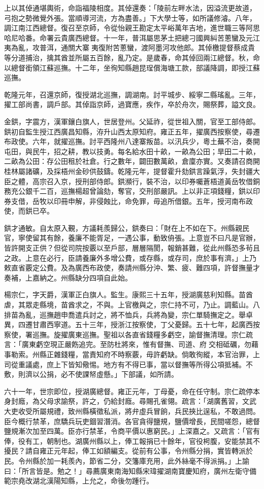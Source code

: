 \begin{pinyinscope}
上以其倬通堪輿術，命詣福陵相度。其倬還奏：「陵前左畔水法，因溢流更故道，弓抱之勢微覺外張。當順導河流，方為盡善。」下大學士等，如所議修濬。八年，調江南江西總督。復召至京師，令從怡親王勘定太平峪萬年吉地，進世職三等阿思哈尼哈番。命署云貴廣西總督。十一年，普洱屬思茅土把總刁國興糾苦蔥蠻及元江夷為亂，攻普洱，通關大寨夷復附苦蔥蠻，渡阿墨河攻他郎。其倬檄提督蔡成貴等分道捕治，擒其酋並所屬五百餘，亂乃定。是歲春，命其倬回兩江總督。秋，命以總督銜領江蘇巡撫。十二年，坐徇知縣趙昆珵償海塘工款，部議降調，即授江蘇巡撫。

乾隆元年，召還京師，復授湖北巡撫，調湖南。討平城步、綏寧二縣瑤亂。三年，擢工部尚書，調戶部。其倬詣京師，過寶應，疾作，卒於舟次，賜祭葬，謚文良。

金鉷，字震方，漢軍鑲白旗人，世居登州。父延祚，從世祖入關，官至工部侍郎。鉷初自監生授江西廣昌知縣，洊升山西太原知府。雍正五年，擢廣西按察使，尋遷布政使。六年，就擢巡撫。討平西隆州八達寨叛苗。以汛兵少，粵土蕪不治，奏開屯田，與民牛，招之耕，教以技勇。每名給水田十畝，一畝為公田；旱田二十畝，二畝為公田：存公田租於社倉。行之數年，闢田數萬畝，倉廩亦實。又奏請召商開桂林屬諸礦，及採梧州金砂供鼓鑄。乾隆元年，提督霍升劾鉷言躁氣浮，失封疆大臣之體，高宗召入京，授刑部侍郎。鉷瀕行，裝不治，以印券囑蒼梧道黃岳牧借銅務充公銀千二百，巡撫楊超曾論劾，奪官，交刑部嚴訊。上以非正項錢糧，鉷以印券支借，岳牧以印冊申解，非侵蝕比，命免罪，毋追所借銀。五年，授河南布政使，而鉷已卒。

鉷才通敏。自太原入覲，方議耗羨歸公，鉷奏曰：「財在上不如在下。州縣親民官，寧使留其有餘，養廉不能胥足，一遇公事，動致侜張。上意豈不曰凡是官辦，皆許開支正供？但從司院按覈以至戶部，層層隔閡，報銷甚難，從此州縣恐多茍且之政。上意在必行，臣請養廉外多增公費，或存縣，或存司，庶於事有濟。」上乃敕直省覈定公費。及為廣西布政使，奏請州縣分沖、繁、疲、難四項，許督撫量才奏補，上嘉納之。州縣缺分四項自此始。

楊宗仁，字天爵，漢軍正白旗人。監生。康熙三十五年，授湖廣慈利知縣。苗酋虐，其眾走縣境，苗酋求之，不與。上官檄與之，宗仁持不可，乃止。調藍山。八排苗為亂，巡撫趙申喬遣兵討之，將不恤兵，兵將為變，宗仁單騎撫定之。舉卓異，四遷甘肅西寧道。五十三年，授浙江按察使，丁父憂歸。五十七年，起廣西按察使，署巡撫。旋擢廣東巡撫。聖祖以各直省錢糧多虧空，諭督撫清理。宗仁疏言：「廣東虧空現正嚴飭追完。至防杜將來，惟有督撫、司道、府交相砥礪，勿藉事勒索。州縣正雜錢糧，當責知府不時察覈，毋許虧缺。倘敢徇縱，本官治罪，上司從重議處，庶上下皆知儆惕。地方有不得已事，當以督撫等所得公項抵補。不敷，則濟以公捐，必不使課帑虛懸。」下部議，如所請。

六十一年，世宗即位，授湖廣總督。雍正元年，丁母憂，命在任守制。宗仁疏停本身封廕，為父母求諭祭，許之，仍給封廕。尋賜孔雀翎。疏言：「湖廣舊習，文武大吏收受所屬規禮，致州縣橫徵私派，將弁虛兵冒餉，兵民挾比逞私，不敢過問。臣今概行禁革，庶驕兵玩吏錮習潛消。各官貪得鹽規，鹽價增長，民間嗟怨，總督鹽規漸次加至四萬。臣亦行禁革，令商平價以惠窮民。」上深嘉之。又疏言：「官有俸，役有工，朝制也。湖廣州縣以上，俸工報捐已十餘年，官役枵腹，安能禁其不擾民？請自雍正元年起，俸工如額編支。從前有公事，令州縣分捐，實皆轉派於民。令州縣於加一耗羨內，節省二分，交籓庫充用，此外絲毫不得派捐。」上諭曰：「所言皆是。勉之！」尋薦廣東南海知縣宋瑋擢湖南寶慶知府，廣州左衛守備範宗堯改湖北漢陽知縣，上允之，命後勿踵行。


\end{pinyinscope}
